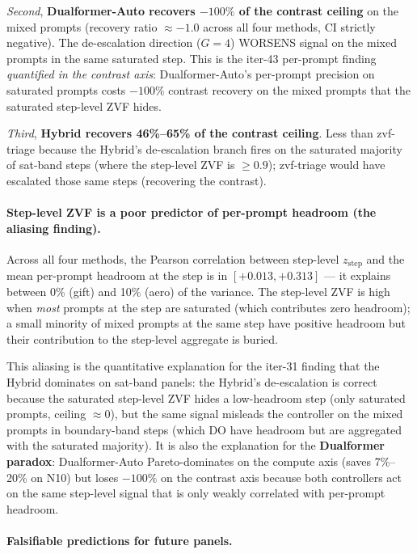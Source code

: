 \emph{Second}, \textbf{Dualformer-Auto recovers $-100\%$ of the
contrast ceiling} on the mixed prompts (recovery ratio $\approx -1.0$
across all four methods, CI strictly negative). The de-escalation
direction ($G{=}4$) WORSENS signal on the mixed prompts in the same
saturated step. This is the iter-43 per-prompt finding \emph{quantified
in the contrast axis}: Dualformer-Auto's per-prompt precision on
saturated prompts costs $-100\%$ contrast recovery on the mixed
prompts that the saturated step-level ZVF hides.

\emph{Third}, \textbf{Hybrid recovers 46\%--65\% of the contrast
ceiling}. Less than zvf-triage because the Hybrid's de-escalation
branch fires on the saturated majority of sat-band steps (where the
step-level ZVF is $\ge 0.9$); zvf-triage would have escalated those
same steps (recovering the contrast).

\paragraph{Step-level ZVF is a poor predictor of per-prompt headroom
(the aliasing finding).} Across all four methods, the Pearson
correlation between step-level $z_{\mathrm{step}}$ and the
mean per-prompt headroom at the step is in $[+0.013, +0.313]$ --- it
explains between 0\% (gift) and 10\% (aero) of the variance. The
step-level ZVF is high when \emph{most} prompts at the step are
saturated (which contributes zero headroom); a small minority of
mixed prompts at the same step have positive headroom but their
contribution to the step-level aggregate is buried.

This aliasing is the quantitative explanation for the iter-31 finding
that the Hybrid dominates on sat-band panels: the Hybrid's
de-escalation is correct because the saturated step-level ZVF hides
a low-headroom step (only saturated prompts, ceiling $\approx 0$), but
the same signal misleads the controller on the mixed prompts in
boundary-band steps (which DO have headroom but are aggregated with
the saturated majority). It is also the explanation for the
\textbf{Dualformer paradox}: Dualformer-Auto Pareto-dominates on the
compute axis (saves 7\%--20\% on N10) but loses $-100\%$ on the
contrast axis because both controllers act on the same step-level
signal that is only weakly correlated with per-prompt headroom.

\paragraph{Falsifiable predictions for future panels.}

